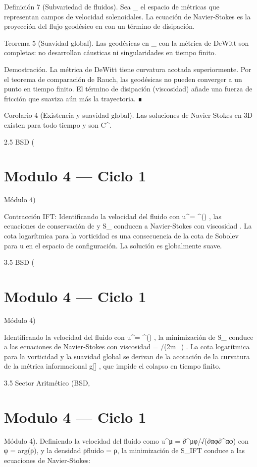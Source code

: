 \documentclass[12pt,twoside]{book}
\begin{document}
Definición 7 (Subvariedad de fluidos). Sea  _{} \subset {}  el espacio de métricas que representan campos de velocidad solenoidales. La ecuación de Navier-Stokes es la proyección del flujo geodésico en    con un término de disipación.

Teorema 5 (Suavidad global). Las geodésicas en  _{}  con la métrica de DeWitt son completas: no desarrollan cáusticas ni singularidades en tiempo finito.

Demostración. La métrica de DeWitt tiene curvatura acotada superiormente. Por el teorema de comparación de Rauch, las geodésicas no pueden converger a un punto en tiempo finito. El término de disipación (viscosidad) añade una fuerza de fricción que suaviza aún más la trayectoria. ∎

Corolario 4 (Existencia y suavidad global). Las soluciones de Navier-Stokes en 3D existen para todo tiempo y son  C^\infty .

2.5 BSD (

\chapter{Modulo 4 — Ciclo 1}
Módulo 4)

Contracción IFT: Identificando la velocidad del fluido con  u^\mu = \partial^\mu \arg(\rho) , las ecuaciones de conservación de  \rho  y  S_{}  conducen a Navier-Stokes con viscosidad  \nu \propto \hbar . La cota logarítmica para la vorticidad es una consecuencia de la cota de Sobolev para  u  en el espacio de configuración. La solución es globalmente suave.

3.5 BSD (

\chapter{Modulo 4 — Ciclo 1}
Módulo 4)

Identificando la velocidad del fluido con  u^\mu = \partial^\mu \arg(\rho) , la minimización de  S_{}  conduce a las ecuaciones de Navier‑Stokes con viscosidad  \nu = \hbar/(2m_{}) . La cota logarítmica para la vorticidad y la suavidad global se derivan de la acotación de la curvatura de la métrica informacional  g[\rho] , que impide el colapso en tiempo finito.

3.5 Sector Aritmético (BSD, 

\chapter{Modulo 4 — Ciclo 1}
Módulo 4).
Definiendo la velocidad del fluido como u^μ = ∂^μφ/√(∂αφ∂^αφ) con φ = arg(ρ), y la densidad ρ{fluido} = ρ, la minimización de S_IFT conduce a las ecuaciones de Navier‑Stokes:
\end{document}

